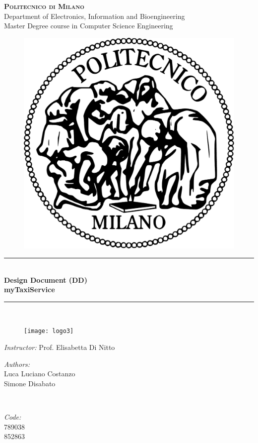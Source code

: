 \documentclass[12pt]{report}
\begin{document}
\pagestyle{empty}

\cleardoublepage


\begin{titlepage}

\newcommand{\HRule}{\rule{\linewidth}{0.5mm}} %

\center %

\textsc{\huge \bf{Politecnico di Milano}}\\[0.5cm]
\textsf{\Large Department of Electronics, Information and Bioengineering}\\[0.25cm] %
\textsf{\large Master Degree course in Computer Science Engineering}\\[0.5cm] %

\begin{figure}[h]
	\center \includegraphics[width = 3 cm]{Figures/PoliMi}
\end{figure}


\HRule \\
{\Huge \bfseries {Design Document (DD)} \\[0.2cm] \Large {myTaxiService}}\\ %
\HRule \\[0.2cm]

\begin{figure}[h]
	\center \texttt{[image: logo3]}
\end{figure}


\begin{flushleft}
	\large \textit{Instructor:} Prof. Elisabetta Di Nitto \\[0.5cm]

\begin{minipage}{0.45\textwidth}
\begin{flushleft} \large
\emph{Authors:}\\
Luca Luciano Costanzo\\
Simone Disabato
\end{flushleft}
\end{minipage}
~
\begin{minipage}{0.45\textwidth}
\begin{flushright} \large
\emph{Code:} \\
789038\\
852863
\end{flushright}
\end{minipage}\\[1cm]


\end{flushleft}
\end{titlepage}
\end{document}
